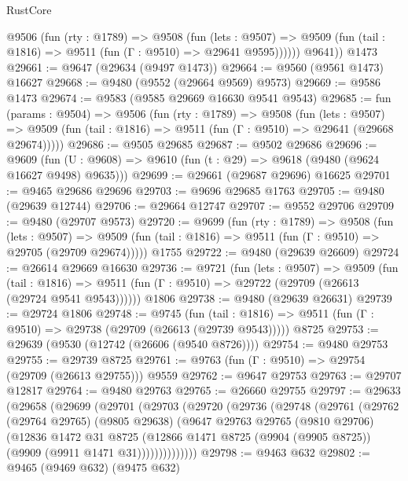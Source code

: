 \begin{lexlean}{RustCore}
\begin{coremodule}
          @9506
            (fun (rty : @1789) =>
            @9508
              (fun (lets : @9507) =>
              @9509 (fun (tail : @1816) => @9511 (fun (Γ : @9510) => @29641 @9595))))))
        @9641))
    @1473
@29661 := @9647 (@29634 (@9497 @1473))
@29664 := @9560 (@9561 @1473) @16627
@29668 := @9480 (@9552 (@29664 @9569) @9573)
@29669 := @9586 @1473
@29674 := @9583 (@9585 @29669 @16630 @9541 @9543)
@29685 := fun (params : @9504) =>
  @9506
    (fun (rty : @1789) =>
    @9508
      (fun (lets : @9507) =>
      @9509 (fun (tail : @1816) => @9511 (fun (Γ : @9510) => @29641 (@29668 @29674)))))
@29686 := @9505 @29685
@29687 := @9502 @29686
@29696 := @9609
    (fun (U : @9608) => @9610 (fun (t : @29) => @9618 (@9480 (@9624 @16627 @9498) @9635)))
@29699 := @29661 (@29687 @29696) @16625
@29701 := @9465 @29686 @29696
@29703 := @9696 @29685 @1763
@29705 := @9480 (@29639 @12744)
@29706 := @29664 @12747
@29707 := @9552 @29706
@29709 := @9480 (@29707 @9573)
@29720 := @9699
    (fun (rty : @1789) =>
    @9508
      (fun (lets : @9507) =>
      @9509 (fun (tail : @1816) => @9511 (fun (Γ : @9510) => @29705 (@29709 @29674)))))
    @1755
@29722 := @9480 (@29639 @26609)
@29724 := @26614 @29669 @16630
@29736 := @9721
    (fun (lets : @9507) =>
    @9509
      (fun (tail : @1816) =>
      @9511 (fun (Γ : @9510) => @29722 (@29709 (@26613 (@29724 @9541 @9543))))))
    @1806
@29738 := @9480 (@29639 @26631)
@29739 := @29724 @1806
@29748 := @9745
    (fun (tail : @1816) => @9511 (fun (Γ : @9510) => @29738 (@29709 (@26613 (@29739 @9543)))))
    @8725
@29753 := @29639 (@9530 (@12742 (@26606 (@9540 @8726))))
@29754 := @9480 @29753
@29755 := @29739 @8725
@29761 := @9763 (fun (Γ : @9510) => @29754 (@29709 (@26613 @29755))) @9559
@29762 := @9647 @29753
@29763 := @29707 @12817
@29764 := @9480 @29763
@29765 := @26660 @29755
@29797 := @29633
    (@29658
      (@29699
        (@29701
          (@29703
            (@29720
              (@29736
                (@29748
                  (@29761
                    (@29762
                      (@29764 @29765)
                      (@9805 @29638)
                      (@9647
                        @29763
                        @29765
                        (@9810 @29706)
                        (@12836
                          @1472
                          @31
                          @8725
                          (@12866
                            @1471
                            @8725
                            (@9904 (@9905 @8725))
                            (@9909 (@9911 @1471 @31))))))))))))))
@29798 := @9463 @632
@29802 := @9465 (@9469 @632) (@9475 @632)

\end{coremodule}
\end{lexlean}
